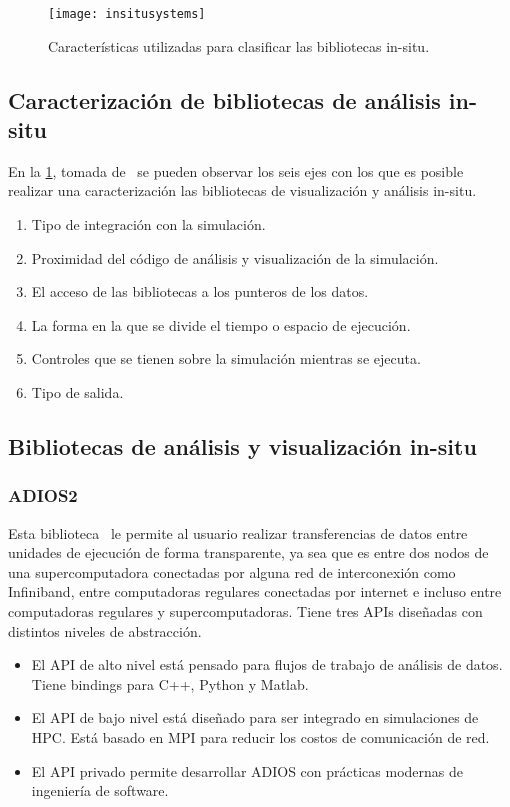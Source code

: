 \begin{figure}
  \texttt{[image: insitusystems]}
  \caption{Características utilizadas para clasificar las bibliotecas in-situ.}
  \label{fig:insitusystems}
  
\end{figure}
\subsection{Caracterización de bibliotecas de análisis in-situ}
En la \cref{fig:insitusystems}, tomada de~\cite{childs_terminology_2020} se pueden observar los seis ejes con los que es posible realizar una caracterización las bibliotecas de visualización y análisis in-situ.
\begin{enumerate}
  \item Tipo de integración con la simulación.
  \item Proximidad del código de análisis y visualización de la simulación.
  \item El acceso de las bibliotecas a los punteros de los datos.
  \item La forma en la que se divide el tiempo o espacio de ejecución.
  \item Controles que se tienen sobre la simulación mientras se ejecuta.
  \item Tipo de salida.
\end{enumerate}
\subsection{Bibliotecas de análisis y visualización in-situ}
\subsubsection{ADIOS2}
Esta biblioteca~\cite{Godoy2020} le permite al usuario realizar transferencias de datos entre unidades de ejecución de forma transparente, ya sea que es entre dos nodos de una supercomputadora conectadas por alguna red de interconexión como Infiniband, entre computadoras regulares conectadas por internet e incluso entre computadoras regulares y supercomputadoras.
Tiene tres APIs diseñadas con distintos niveles de abstracción.
\begin{itemize}
  \item El API de alto nivel está pensado para flujos de trabajo de análisis de datos. Tiene bindings para C++, Python y Matlab.
  \item El API de bajo nivel está diseñado para ser integrado en simulaciones de HPC. Está basado en MPI para reducir los costos de comunicación de red.
  \item El API privado permite desarrollar ADIOS con prácticas modernas de ingeniería de software.
\end{itemize}

